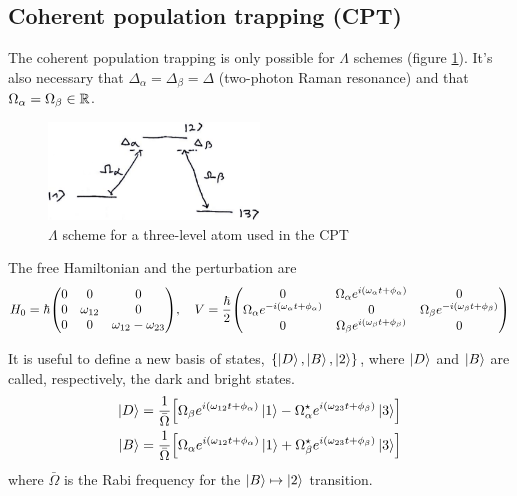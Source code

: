\subsection[Coherent population trapping]{Coherent population trapping (CPT)}
The coherent population trapping is only possible for $\Lambda$ schemes (figure \ref{fig:lambda-scheme-cpt}). It's also necessary that $\Delta_{\alpha} = \Delta_{\beta} = \Delta$ (two-photon Raman resonance) and that $\Omega_{\alpha} = \Omega_{\beta} \in \mathbb{R}$.
\begin{figure}[H]
	\centering
	\includegraphics[width=0.5\textwidth]{./images/3-lambda-scheme-cpt}
	\caption{$\Lambda$ scheme for a three-level atom used in the CPT}
	\label{fig:lambda-scheme-cpt}
\end{figure}
The free Hamiltonian and the perturbation are
\begin{align*}
	H_{0} = \hbar \mqty( 0 & 0 & 0 \\ 0 & \omega_{12} & 0 \\ 0 & 0 & \omega_{12} - \omega_{23} ) \qc V = \frac{\hbar}{2} \mqty( 0 & \Omega_{\alpha} e^{i(\omega_{\alpha} t + \phi_{\alpha})} & 0 \\ \Omega_{\alpha} e^{-i(\omega_{\alpha} t + \phi_{\alpha})} & 0 & \Omega_{\beta} e^{-i(\omega_{\beta} t + \phi_{\beta})} \\ 0 & \Omega_{\beta} e^{i(\omega_{\beta} t + \phi_{\beta})} & 0 )
\end{align*}

\begin{defi}
It is useful to define a new basis of states, $\qty{ \ket{D}, \ket{B}, \ket{2}}$, where $\ket{D}$ and $\ket{B}$ are called, respectively, the dark and bright states.
	\begin{subequations}
	\begin{align}
		\ket{D} &= \frac{1}{\bar{\Omega}} \qty[ \Omega_{\beta} e^{i(\omega_{12}t + \phi_{\alpha})} \ket{1} - \Omega_{\alpha}^{\star}{} e^{i(\omega_{23}t + \phi_{\beta})} \ket{3}] \\
		\ket{B} &= \frac{1}{\bar{\Omega}} \qty[ \Omega_{\alpha} e^{i(\omega_{12}t + \phi_{\alpha})} \ket{1} + \Omega_{\beta}^{\star}{} e^{i(\omega_{23}t + \phi_{\beta})} \ket{3}]
	\end{align}
	\end{subequations}
	where $\bar{\Omega}$ is the Rabi frequency for the $\ket{B} \mapsto \ket{2}$ transition.
\end{defi}

